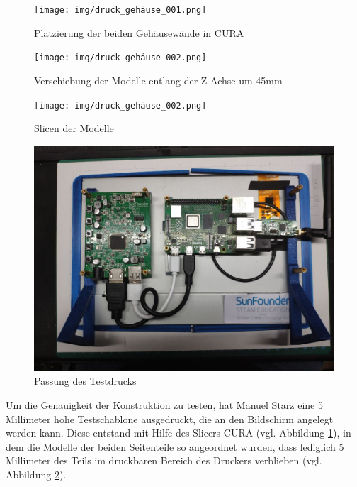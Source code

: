 	\begin{figure}[h!]
		\texttt{[image: img/druck\_gehäuse\_001.png]}
		\caption[Platzierung der beiden Gehäusewände in CURA]{Platzierung der beiden Gehäusewände in CURA}
		\label{fig:print-case-test_01}
	\end{figure}
	\begin{figure}[h!]
		\texttt{[image: img/druck\_gehäuse\_002.png]}
		\caption[Verschiebung der Modelle entlang der Z-Achse um 45mm]{Verschiebung der Modelle entlang der Z-Achse um 45mm}
		\label{fig:print-case-test_02}
	\end{figure}
	\begin{figure}[h!]
		\texttt{[image: img/druck\_gehäuse\_002.png]}
		\caption[Slicen der Modelle]{Slicen der Modelle}
		\label{fig:print-case-test_03}
	\end{figure}
	\begin{figure}[h!]
		\includegraphics[width=1\textwidth]{img/testdruck_an_bildschirm.jpg}
		\caption[Passung des Testdrucks]{Passung des Testdrucks}
		\label{fig:print-case-test_04}
	\end{figure}
	Um die Genauigkeit der Konstruktion zu testen, hat Manuel Starz eine 5 Millimeter hohe Testschablone ausgedruckt, die an den Bildschirm angelegt werden kann. Diese entstand mit Hilfe des Slicers CURA (vgl. Abbildung \ref{fig:print-case-test_01}), in dem die Modelle der beiden Seitenteile so angeordnet wurden, dass lediglich 5 Millimeter des Teils im druckbaren Bereich des Druckers verblieben (vgl. Abbildung \ref{fig:print-case-test_02}).\par